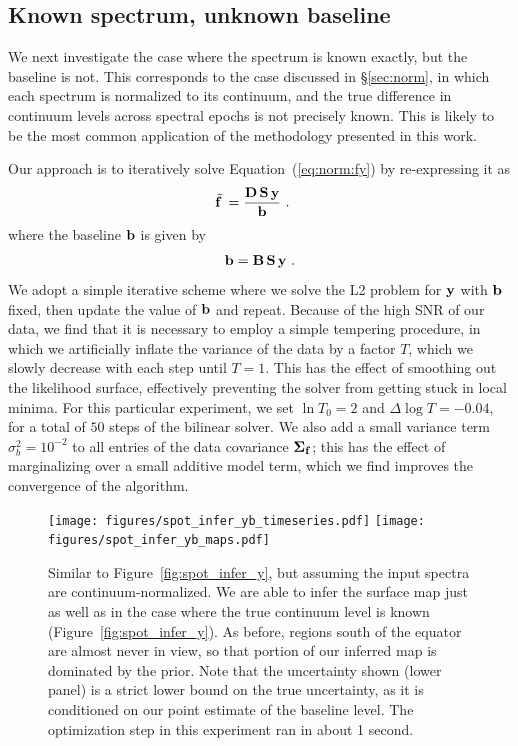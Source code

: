 \documentclass[modern]{aastex631}
\def\timeInferYB{about 1 second\xspace}
\begin{document}
\subsection{Known spectrum, unknown baseline}
\label{sec:spot_y1b}
%
We next investigate the case where the spectrum is known exactly, but the baseline is not. 
This corresponds to the case discussed in \S\ref{sec:norm}, in which each spectrum is normalized to its continuum, and the true difference in continuum levels across spectral epochs is not precisely known.
This is likely to be the most common application of the methodology presented in this work.

Our approach is to iteratively solve Equation~(\ref{eq:norm:fy}) by re-expressing it as
%
\begin{align}
    \tilde{{\mathbf{f}}\hspace{0.2em}}
     & =
    \frac{
        {\mathbf{D}}
        \,
        {\mathbf{S}}
        \,
        {\mathbf{y}}
    }{
        {\mathbf{b}}
    }
    \hskip 0.33em.
\end{align}
%
where the baseline ${\mathbf{b}}$ is given by
%
\begin{align}
    {\ensuremath{\mathbf{b}}}
    =
    {\mathbf{B}}
    \,
    {\mathbf{S}}
    \,
    {\mathbf{y}}
    \hskip 0.33em.
\end{align}
%
We adopt a simple iterative scheme where we solve the L2 problem for ${\mathbf{y}}$ with ${\mathbf{b}}$ fixed, then update the value of ${\mathbf{b}}$ and repeat.
Because of the high SNR of our data, we find that it is necessary to employ a simple tempering procedure, in which we artificially inflate the variance of the data by a factor $T$, which we slowly decrease with each step until $T = 1$. 
This has the effect of smoothing out the likelihood surface, effectively preventing the solver from getting stuck in local minima.
For this particular experiment, we set $\ln T_0 = 2$ and $\Delta \log T = -0.04$, for a total of $50$ steps of the bilinear solver.
We also add a small variance term $\sigma_b^2 = 10^{-2}$ to all entries of the data covariance $\boldsymbol{\Sigma}_{{\mathbf{f}}}$; this has the effect of marginalizing over a small additive model term, which we find improves the convergence of the algorithm.

\begin{figure}[p!]
    \begin{centering}
        \texttt{[image: figures/spot\_infer\_yb\_timeseries.pdf]}
        \texttt{[image: figures/spot\_infer\_yb\_maps.pdf]}
        \caption{%
            Similar to Figure~\ref{fig:spot_infer_y}, but assuming the input spectra are continuum-normalized.
            We are able to infer the surface map just as well as in the case where the true continuum level is known (Figure~\ref{fig:spot_infer_y}). 
            As before, regions south of the equator are almost never in view, so that portion of our inferred map is dominated by the prior.
            Note that the uncertainty shown (lower panel) is a strict lower bound on the true uncertainty, as it is conditioned on our point estimate of the baseline level.
            The optimization step in this experiment ran in \timeInferYB.
        }
        \label{fig:spot_infer_yb}
    \end{centering}
\end{figure}
\end{document}

